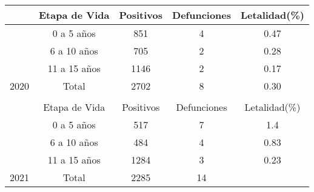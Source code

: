 	\begin{tabular}{lcccc}
		\cline{2-5}
		\multicolumn{1}{l|}{} &
		\multicolumn{1}{c|}{\cellcolor[HTML]{ECF4FF}Etapa de Vida} &
		\multicolumn{1}{c|}{\cellcolor[HTML]{ECF4FF}Positivos} &
		\multicolumn{1}{c|}{\cellcolor[HTML]{ECF4FF}Defunciones} &
		\multicolumn{1}{c|}{\cellcolor[HTML]{ECF4FF}Letalidad(\%)} \\ \hline
		\multicolumn{1}{|l|}{} &
		\multicolumn{1}{c|}{0 a 5 años} &
		\multicolumn{1}{c|}{851} &
		\multicolumn{1}{c|}{4} &
		\multicolumn{1}{c|}{0.47} \\ \cline{2-5} 
		\multicolumn{1}{|l|}{} &
		\multicolumn{1}{c|}{6 a 10 años} &
		\multicolumn{1}{c|}{705} &
		\multicolumn{1}{c|}{2} &
		\multicolumn{1}{c|}{0.28} \\ \cline{2-5} 
		\multicolumn{1}{|l|}{} &
		\multicolumn{1}{c|}{11 a 15 años} &
		\multicolumn{1}{c|}{1146} &
		\multicolumn{1}{c|}{2} &
		\multicolumn{1}{c|}{0.17} \\ \cline{2-5} 
		\multicolumn{1}{|l|}{\multirow{-4}{*}{2020}} &
		\multicolumn{1}{c|}{\cellcolor[HTML]{ECF4FF}Total} &
		\multicolumn{1}{c|}{\cellcolor[HTML]{ECF4FF}2702} &
		\multicolumn{1}{c|}{\cellcolor[HTML]{ECF4FF}8} &
		\multicolumn{1}{c|}{\cellcolor[HTML]{ECF4FF}0.30} \\ \hline
		&
		\multicolumn{1}{l}{} &
		\multicolumn{1}{l}{} &
		\multicolumn{1}{l}{} &
		\multicolumn{1}{l}{} \\ \cline{2-5} 
		\multicolumn{1}{l|}{} &
		\multicolumn{1}{c|}{\cellcolor[HTML]{ECF4FF}Etapa de Vida} &
		\multicolumn{1}{c|}{\cellcolor[HTML]{ECF4FF}Positivos} &
		\multicolumn{1}{c|}{\cellcolor[HTML]{ECF4FF}Defunciones} &
		\multicolumn{1}{c|}{\cellcolor[HTML]{ECF4FF}Letalidad(\%)} \\ \hline
		\multicolumn{1}{|l|}{} &
		\multicolumn{1}{c|}{0 a 5 años} &
		\multicolumn{1}{c|}{517} &
		\multicolumn{1}{c|}{7} &
		\multicolumn{1}{c|}{1.4} \\ \cline{2-5} 
		\multicolumn{1}{|l|}{} &
		\multicolumn{1}{c|}{6 a 10 años} &
		\multicolumn{1}{c|}{484} &
		\multicolumn{1}{c|}{4} &
		\multicolumn{1}{c|}{0.83} \\ \cline{2-5} 
		\multicolumn{1}{|l|}{} &
		\multicolumn{1}{c|}{11 a 15 años} &
		\multicolumn{1}{c|}{1284} &
		\multicolumn{1}{c|}{3} &
		\multicolumn{1}{c|}{0.23} \\ \cline{2-5} 
		\multicolumn{1}{|l|}{\multirow{-4}{*}{2021}} &
		\multicolumn{1}{c|}{\cellcolor[HTML]{ECF4FF}Total} &
		\multicolumn{1}{c|}{\cellcolor[HTML]{ECF4FF}2285} &
		\multicolumn{1}{c|}{\cellcolor[HTML]{ECF4FF}14} &

\end{tabular}
